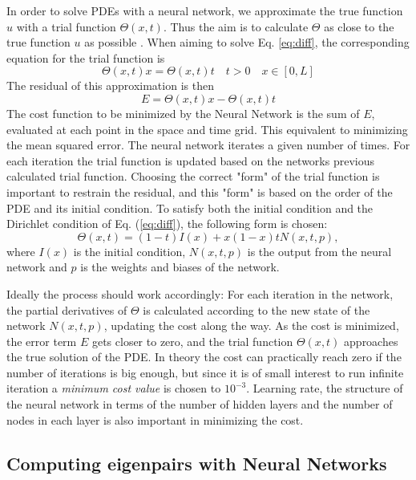 \documentclass[a4paper,11pt,twocolumn]{article}
\begin{document}
In order to solve PDEs with a neural network, we approximate the true function $u$ with a trial function $\Theta (x,t)$. Thus the aim is to calculate $\Theta$ as close to the true function $u$ as possible \cite{lagaris}. When aiming to solve Eq. \eqref{eq:diff}, the corresponding equation for the trial function is
\begin{equation*}
   {\Theta(x,t)}{x} = {\Theta(x,t)}{t} \quad t>0 \quad x\in [0,L]
\end{equation*}
The residual of this approximation is then
\begin{equation}
    E = {\Theta(x,t)}{x} - {\Theta(x,t)}{t}
    \label{eq:error}
\end{equation}
The cost function to be minimized by the Neural Network is the sum of $E$, evaluated at each point in the space and time grid. This equivalent to minimizing the mean squared error. The neural network iterates a given number of times. For each iteration the trial function is updated based on the networks previous calculated trial function. Choosing the correct "form" of the trial function is important to restrain the residual, and this "form" is based on the order of the PDE and its initial condition. To satisfy both the initial condition and the Dirichlet condition of Eq. (\ref{eq:diff}), the following form is chosen:
\begin{equation}
    \Theta (x,t) = (1-t)I(x) + x(1-x)tN(x,t,p),
    \label{eq:trial}
\end{equation}
where $I(x)$ is the initial condition, $N(x,t,p)$ is the output from the neural network and $p$ is the weights and biases of the network. 

Ideally the process should work accordingly: For each iteration in the network, the partial derivatives of $\Theta$ is calculated according to the new state of the network $N(x, t, p)$, updating the cost along the way. As the cost is minimized, the error term $E$ gets closer to zero, and the trial function $\Theta (x,t)$ approaches the true solution of the PDE. In theory the cost can practically reach zero if the number of iterations is big enough, but since it is of small interest to run infinite iteration a \textit{minimum cost value} is chosen to $10^{-3}$. Learning rate, the structure of the neural network in terms of the number of hidden layers and the number of nodes in each layer is also important in minimizing the cost. 

\subsection{Computing eigenpairs with Neural Networks}
\end{document}
